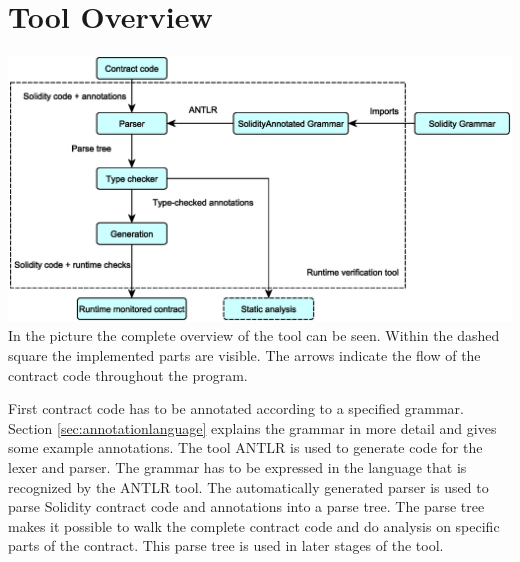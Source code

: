 \documentclass[a4paper]{article}
\begin{document}
\newpage
\section{Tool Overview}
\label{sec:tooloverview}
\includegraphics[width=\textwidth,height=\textheight,keepaspectratio]{resources/ToolOverview.eps} 
In the picture the complete overview of the tool can be seen. Within the dashed square the implemented parts are visible. The arrows indicate the flow of the contract code throughout the program. \par
First contract code has to be annotated according to a specified grammar. Section \ref{sec:annotationlanguage} explains the grammar in more detail and gives some example annotations. The tool ANTLR \cite{parr2013definitive} is used to generate code for the lexer and parser. The grammar has to be expressed in the language that is recognized by the ANTLR tool. The automatically generated parser is used to parse Solidity contract code and annotations into a parse tree. The parse tree makes it possible to walk the complete contract code and do analysis on specific parts of the contract. This parse tree is used in later stages of the tool. \par
\end{document}
